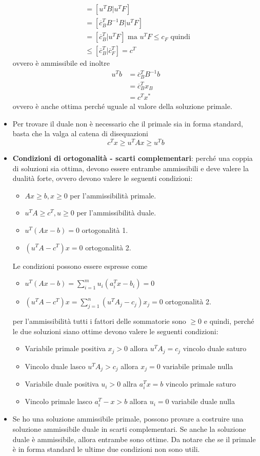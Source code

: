 \begin{itemize}
\begin{align*}
		      &= [u^TB | u^T F] \\
		      &= [\overline{c}_{B}^TB^{-1} B | u^T F] \\
		      &= [\overline{c}_{B}^T | u^T F] \text{ ma $u^T F \leq c_F$ quindi }\\
		      &\leq [\overline{c}_{B}^T | \overline{c}_{F}^T] = c^T
	\end{align*}
	ovvero è ammissibile ed inoltre
	\begin{align*}
		u^T b &= \overline{c}_{B}^TB^{-1}b \\
		      &= \overline{c}_{B}^T x_B \\
		      &= c^T x^*
	\end{align*}
	ovvero è anche ottima perché uguale al valore della soluzione primale.
	\item Per trovare il duale non è necessario che il primale sia in forma standard, basta che la valga al catena di disequazioni
	$$
	c^T x \geq u^T A x \geq u^T b
	$$
	\item \textbf{Condizioni di ortogonalità - scarti complementari}: perché una coppia di soluzioni sia ottima, devono essere entrambe ammissibili e deve valere la dualità forte, ovvero devono valere le seguenti condizioni:
	\begin{itemize}
		\item $Ax \geq b, x \geq 0$ per l'ammissibilità primale.
		\item $u^TA \geq c^T, u \geq 0$ per l'ammissibilità duale.
		\item $u^T(Ax-b) = 0$ ortogonalità 1.
		\item $(u^T A - c^T)x = 0$ ortogonalità 2.
	\end{itemize}
	Le condizioni possono essere espresse come
	\begin{itemize}
		\item $u^T(Ax-b) = \sum\limits_{i = 1}^m u_i (a_{i}^Tx - b_i) = 0$
		\item $(u^T A - c^T)x = \sum\limits_{j = 1 }^n (u^T A_{j} - c_{j})x_j = 0$ ortogonalità 2.
	\end{itemize}
	per l'ammissibilità tutti i fattori delle sommatorie sono $\geq 0$ e quindi, perché le due soluzioni siano ottime devono valere le seguenti condizioni:
	\begin{itemize}
		\item Variabile primale positiva $x_j > 0$ allora $u^TA_j = c_j$ vincolo duale saturo
		\item Vincolo duale lasco $u^TA_j > c_j$ allora $x_j = 0$ variabile primale nulla
		\item Variabile duale positiva $u_i > 0$ allra $a_{i}^Tx = b $ vincolo primale saturo 
		\item Vincolo primale lasco $a_{i}^T-x > b$ allora $u_i = 0$ variabile duale nulla
	\end{itemize}
	\item Se ho una soluzione ammissibile primale, possono provare a costruire una soluzione ammissibile duale in scarti complementari. Se anche la soluzione duale è ammissibile, allora entrambe sono ottime. Da notare che se il primale è in forma standard le ultime due condizioni non sono utili.
\end{itemize}

